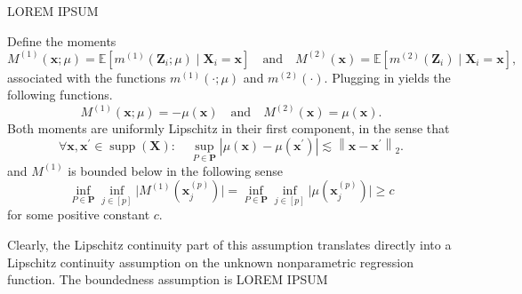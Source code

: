 \documentclass[letterpaper,10pt]{article}
\numberwithin{equation}{section}
\numberwithin{theorem}{section}
\theoremstyle{definition}
\newcommand{\1}{\mathbb{1}}
\begin{document}
\vspace{0.5cm}
\begin{assumption}

\end{assumption}

{\color{red} LOREM IPSUM}




\vspace{0.5cm}
\begin{assumption}
	Define the moments
	\begin{equation}
		M^{(1)}(\mathbf{x} ; \mu)
		= \mathbb{E}\left[m^{(1)}\left(\mathbf{Z}_i ; \mu\right) \mid \mathbf{X}_i= \mathbf{x}\right]
		\quad \text{and} \quad
		M^{(2)}(\mathbf{x})
		= \mathbb{E}\left[m^{(2)}\left(\mathbf{Z}_i\right) \mid \mathbf{X}_i = \mathbf{x}\right],
	\end{equation}
	associated with the functions $m^{(1)}(\cdot ; \mu)$ and $m^{(2)}(\cdot)$.
	Plugging in yields the following functions.
	\begin{equation}
		M^{(1)}(\mathbf{x} ; \mu)
		= -\mu(\mathbf{x})
		\quad \text{and} \quad
		M^{(2)}(\mathbf{x})
		= \mu(\mathbf{x}).
	\end{equation}
	Both moments are uniformly Lipschitz in their first component, in the sense that
	\begin{equation}
		\forall \mathbf{x}, \mathbf{x}^{\prime} \in \operatorname{supp}\left(\mathbf{X}\right): \quad
		\sup _{P \in \mathbf{P}}
		\left|\mu(\mathbf{x})-\mu\left(\mathbf{x}^{\prime}\right)\right|
		\lesssim\left\|\mathbf{x}-\mathbf{x}^{\prime}\right\|_{2}.
	\end{equation}
	and $M^{(1)}$ is bounded below in the following sense
	\begin{equation}
		\inf_{P \in \mathbf{P}} \inf_{j \in [p]} \Big|M^{(1)}\left(\mathbf{x}^{(p)}_{j}\right) \Big|
		= \inf_{P \in \mathbf{P}} \inf_{j \in [p]} \Big|\mu\left(\mathbf{x}^{(p)}_{j}\right) \Big| \geq c
	\end{equation}
	for some positive constant $c$.
\end{assumption}

Clearly, the Lipschitz continuity part of this assumption translates directly into a Lipschitz continuity assumption on the unknown nonparametric regression function.
The boundedness assumption is
	{\color{red} LOREM IPSUM}
\end{document}
